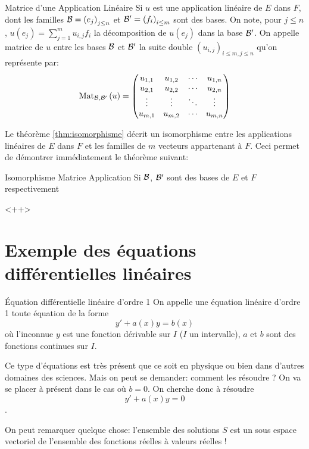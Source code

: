 \documentclass{classe}
\begin{document}
\begin{définition}{Matrice d'une Application Linéaire}{}
	Si $u$ est une application linéaire de $E$ dans $F$, dont les familles $\mathcal{B} = \left(e_{j}\right)_{j\leq n}$ et $\mathcal{B}' = \left(f_{i}\right)_{i\leq m}$ sont des bases.
	On note, pour $j \leq n$, $u\left( e_{j} \right) = \sum_{j = 1}^{m}u_{i, j}f_{i}$ la décomposition de $u(e_{j})$ dans la base $\mathcal{B}'$.
	On appelle matrice de $u$ entre les bases $\mathcal{B}$ et $\mathcal{B}'$ la suite double $\left( u_{i, j} \right)_{i \leq m, j\leq n}$ qu'on représente par:
	\begin{equation*}
		\operatorname{Mat}_{\mathcal{B}, \mathcal{B}'}\left( u \right) = \begin{pmatrix}
			u_{1, 1} & u_{1, 2} & \cdots & u_{1, n}\\
			u_{2, 1} & u_{2, 2} & \cdots & u_{2, n}\\
			\vdots & \vdots & \ddots & \vdots \\
			u_{m, 1} & u_{m, 2} & \cdots & u_{m, n}
		\end{pmatrix}
	\end{equation*}
\end{définition}

Le théorème \ref{thm:isomorphisme} décrit un isomorphisme entre les applications linéaires de $E$ dans $F$ et les familles de $m$ vecteurs appartenant à $F$.
Ceci permet de démontrer immédiatement le théorème suivant:
\begin{théorème}{Isomorphisme Matrice Application}{}
	Si $\mathcal{B}$, $\mathcal{B}'$ sont des bases de $E$ et $F$ respectivement
\end{théorème}<++>
\section{Exemple des équations différentielles linéaires}

\begin{définition}{Équation différentielle linéaire d'ordre 1}{}
On appelle une équation linéaire d'ordre 1 toute équation de la forme
$$y' + a(x)y = b(x)$$
où l'inconnue $y$ est une fonction dérivable sur $I$ ($I$ un intervalle), $a$ et $b$ sont des fonctions continues sur $I$.
\end{définition}

Ce type d'équations est très présent que ce soit en physique ou bien dans d'autres domaines des sciences. Mais on peut se demander: comment les résoudre ? On va se placer à présent dans le cas où $b=0$. On cherche donc à résoudre
$$y' + a(x)y = 0$$.

On peut remarquer quelque chose: l'ensemble des solutions $S$ est un sous espace vectoriel de l'ensemble des fonctions réelles à valeurs réelles !
\end{document}
